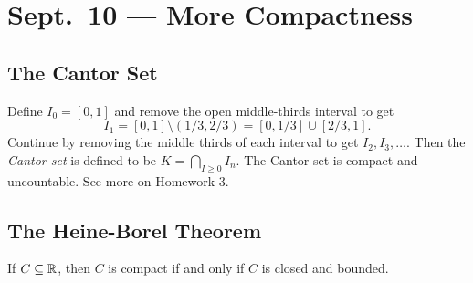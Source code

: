 \chapter{Sept.~10 --- More Compactness}

\section{The Cantor Set}
Define $I_0 = [0, 1]$ and remove the open middle-thirds
interval to get
\[
  I_1 = [0, 1] \setminus (1 / 3, 2 / 3) = [0, 1 / 3] \cup [2 / 3, 1].
\]
Continue by removing the middle thirds of each interval
to get $I_2, I_3, \ldots$. Then the
\emph{Cantor set} is defined to be
$K = \bigcap_{I \ge 0} I_n$. The Cantor set is
compact and uncountable. See more on Homework 3.

\section{The Heine-Borel Theorem}
\begin{theorem}
  If $C \subseteq \mathbb{R}$, then $C$ is compact if
  and only if $C$ is closed and bounded.
\end{theorem}


